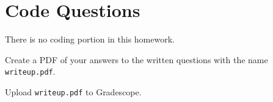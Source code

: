 \documentclass{16384_doc}
\begin{document}
\section{Code Questions}

There is no coding portion in this homework.

\begin{submissionChecklist}
		\item Create a PDF of your answers to the written questions with the name \verb!writeup.pdf!.
		\item Upload \verb!writeup.pdf! to Gradescope.
\end{submissionChecklist}
\end{document}
